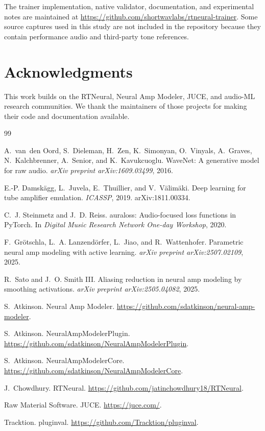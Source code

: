 \documentclass[11pt]{article}
\begin{document}
The trainer implementation, native validator, documentation, and experimental
notes are maintained at
\url{https://github.com/shortwavlabs/rtneural-trainer}. Some source captures
used in this study are not included in the repository because they contain
performance audio and third-party tone references.

\section*{Acknowledgments}

This work builds on the RTNeural, Neural Amp Modeler, JUCE, and audio-ML
research communities. We thank the maintainers of those projects for making
their code and documentation available.

\begin{thebibliography}{99}

A.~van~den Oord, S.~Dieleman, H.~Zen, K.~Simonyan, O.~Vinyals, A.~Graves,
N.~Kalchbrenner, A.~Senior, and K.~Kavukcuoglu.
\newblock WaveNet: A generative model for raw audio.
\newblock \emph{arXiv preprint arXiv:1609.03499}, 2016.

E.-P. Damsk\"agg, L.~Juvela, E.~Thuillier, and V.~V\"alim\"aki.
\newblock Deep learning for tube amplifier emulation.
\newblock \emph{ICASSP}, 2019. arXiv:1811.00334.

C.~J. Steinmetz and J.~D. Reiss.
\newblock auraloss: Audio-focused loss functions in PyTorch.
\newblock In \emph{Digital Music Research Network One-day Workshop}, 2020.

F.~Gr\"otschla, L.~A. Lanzend\"orfer, L.~Jiao, and R.~Wattenhofer.
\newblock Parametric neural amp modeling with active learning.
\newblock \emph{arXiv preprint arXiv:2507.02109}, 2025.

R.~Sato and J.~O. Smith III.
\newblock Aliasing reduction in neural amp modeling by smoothing activations.
\newblock \emph{arXiv preprint arXiv:2505.04082}, 2025.

S.~Atkinson.
\newblock Neural Amp Modeler.
\newblock \url{https://github.com/sdatkinson/neural-amp-modeler}.

S.~Atkinson.
\newblock NeuralAmpModelerPlugin.
\newblock \url{https://github.com/sdatkinson/NeuralAmpModelerPlugin}.

S.~Atkinson.
\newblock NeuralAmpModelerCore.
\newblock \url{https://github.com/sdatkinson/NeuralAmpModelerCore}.

J.~Chowdhury.
\newblock RTNeural.
\newblock \url{https://github.com/jatinchowdhury18/RTNeural}.

Raw Material Software.
\newblock JUCE.
\newblock \url{https://juce.com/}.

Tracktion.
\newblock pluginval.
\newblock \url{https://github.com/Tracktion/pluginval}.

\end{thebibliography}
\end{document}
